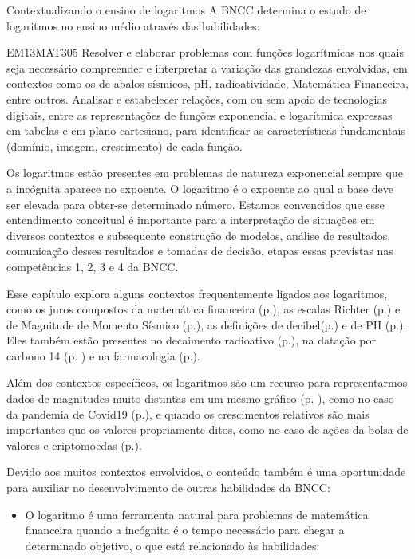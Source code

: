 \begin{apresentacao}{Contextualizando o ensino de logaritmos}
A BNCC determina o estudo de logaritmos no ensino médio através das habilidades:

\begin{habilities}{EM13MAT305}
Resolver e elaborar problemas com funções logarítmicas nos quais seja necessário compreender e interpretar a variação das grandezas envolvidas, em contextos como os de abalos sísmicos, pH, radioatividade, Matemática Financeira, entre outros.
Analisar e estabelecer relações, com ou sem apoio de tecnologias digitais, entre as representações de funções exponencial e logarítmica expressas em tabelas e em plano cartesiano, para identificar as características fundamentais (domínio, imagem, crescimento) de cada função.
\end{habilities}

Os logaritmos estão presentes em problemas de natureza exponencial sempre que a incógnita aparece no expoente. O logaritmo é o expoente ao qual a base deve ser elevada para obter-se determinado número. Estamos convencidos que esse entendimento conceitual é importante para a interpretação de situações em diversos contextos e subsequente construção de modelos, análise de resultados, comunicação desses resultados e  tomadas de decisão, etapas essas previstas nas competências 1, 2, 3 e 4 da BNCC.


Esse capítulo explora alguns contextos frequentemente ligados aos logaritmos, como os juros compostos da matemática financeira (p.\pageref{expoente_incog}), as escalas Richter (p.\pageref{EscalaRichter}) e de Magnitude de Momento Sísmico (p.\pageref{EscalaMMS}), as definições de decibel(p.\pageref{Decibel}) e de PH (p.\pageref{EscalaPH}). Eles também estão presentes no decaimento radioativo (p.\pageref{DecaimentoRadioativo}), na datação por carbono 14 (p. \pageref{Carbono14}) e na farmacologia (p.\pageref{Farmaco}).

Além dos contextos específicos, os logaritmos são um recurso para representarmos dados de magnitudes muito distintas em um mesmo gráfico (p. \pageref{SistemaSolar}), como no caso da pandemia de Covid19 (p.\pageref{Covid19Exer}), e quando os crescimentos relativos são mais importantes que os valores propriamente ditos, como no caso de ações da bolsa de valores e criptomoedas (p.\pageref{Criptomoedas}).

Devido aos muitos contextos envolvidos, o conteúdo também é uma oportunidade para auxiliar no desenvolvimento de outras habilidades da BNCC:
\begin{itemize}
\item O logaritmo é uma ferramenta natural para problemas de matemática financeira quando a incógnita é o tempo necessário para chegar a determinado objetivo, o que está relacionado às habilidades:
\end{itemize}


\end{apresentacao}
